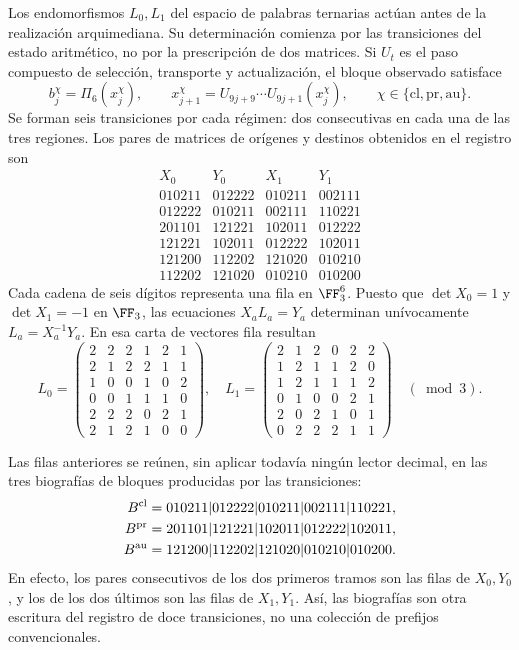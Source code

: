 Los endomorfismos \(L_0,L_1\) del espacio de palabras ternarias actúan antes de la realización arquimediana. Su determinación comienza por las transiciones del estado aritmético, no por la prescripción de dos matrices. Si \(U_t\) es el paso compuesto de selección, transporte y actualización, el bloque observado satisface
\[
 b_j^\chi=\Pi_6(x_j^\chi),\qquad
 x_{j+1}^\chi=U_{9j+9}\cdots U_{9j+1}(x_j^\chi),
 \qquad \chi\in\{\mathrm{cl},\mathrm{pr},\mathrm{au}\}.
\]
Se forman seis transiciones por cada régimen: dos consecutivas en cada una de las tres regiones. Los pares de matrices de orígenes y destinos obtenidos en el registro son
\[
\begin{array}{c|c|c|c}
X_0&Y_0&X_1&Y_1\\\hline
010211&012222&010211&002111\\
012222&010211&002111&110221\\
201101&121221&102011&012222\\
121221&102011&012222&102011\\
121200&112202&121020&010210\\
112202&121020&010210&010200
\end{array}
\]
Cada cadena de seis dígitos representa una fila en \(\FF_3^6\). Puesto que \(\det X_0=1\) y \(\det X_1=-1\) en \(\FF_3\), las ecuaciones \(X_aL_a=Y_a\) determinan unívocamente \(L_a=X_a^{-1}Y_a\). En esa carta de vectores fila resultan
\[
 L_0=\begin{pmatrix}
 2&2&2&1&2&1\\2&1&2&2&1&1\\1&0&0&1&0&2\\
 0&0&1&1&1&0\\2&2&2&0&2&1\\2&1&2&1&0&0
 \end{pmatrix},\quad
 L_1=\begin{pmatrix}
 2&1&2&0&2&2\\1&2&1&1&2&0\\1&2&1&1&1&2\\
 0&1&0&0&2&1\\2&0&2&1&0&1\\0&2&2&2&1&1
 \end{pmatrix}\quad(\bmod3).
\]

Las filas anteriores se reúnen, sin aplicar todavía ningún lector decimal,
en las tres biografías de bloques producidas por las transiciones:
\begin{align}
 B^{\rm cl}
  &=010211|012222|010211|002111|110221,\notag\\
 B^{\rm pr}
  &=201101|121221|102011|012222|102011,
 \label{eq:biografias-tpk-tres-caracteres}\\
 B^{\rm au}
  &=121200|112202|121020|010210|010200.\notag
\end{align}
En efecto, los pares consecutivos de los dos primeros tramos son las filas
de \(X_0,Y_0\), y los de los dos últimos son las filas de \(X_1,Y_1\).
Así, las biografías son otra escritura del registro de doce transiciones, no
una colección de prefijos convencionales.

